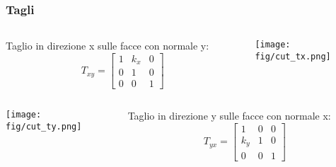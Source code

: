 \begin{frame}
\frametitle{Tagli}
\begin{columns}
\begin{column}{0.48\textwidth}
Taglio in direzione x sulle facce con normale y:
\begin{equation}
T_{xy}=\begin{bmatrix}
    1 & k_x & 0\\
    0 & 1   & 0\\
    0 & 0   & 1
    \end{bmatrix}
\end{equation}
\end{column}
\begin{column}{0.48\textwidth}
\texttt{[image: \\fig/cut\_tx.png]}
\end{column}
\end{columns}
%
\begin{columns}
\begin{column}{0.48\textwidth}
\texttt{[image: \\fig/cut\_ty.png]}
\end{column}
\begin{column}{0.48\textwidth}
Taglio in direzione y sulle facce con normale x:
\begin{equation}
T_{yx}=\begin{bmatrix}
    1   & 0 & 0\\
    k_y & 1 & 0\\
    0   & 0 & 1
    \end{bmatrix}
\end{equation}
\end{column}
\end{columns}
\end{frame}
%
